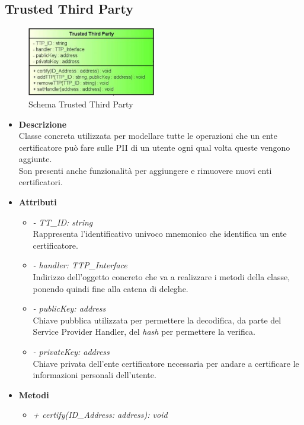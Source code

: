 \subsection{Trusted Third Party}
\begin{figure}[!h]
	\centering
	\includegraphics[width=0.5\textwidth]{immagini/ttpData}
	\caption{Schema Trusted Third Party}
\end{figure}
\begin{itemize}
	\item \textbf{Descrizione}\\
	Classe concreta utilizzata per modellare tutte le operazioni che un ente certificatore può fare sulle \gls{PII} di un utente ogni qual volta queste vengono aggiunte.\\
	Son presenti anche funzionalità per aggiungere e rimuovere nuovi enti certificatori.
	\item \textbf{Attributi}
	\begin{itemize}
		\item \textit{- TT\_ID: string}\\
		Rappresenta l'identificativo univoco mnemonico che identifica un ente certificatore.
		\item \textit{- handler: TTP\_Interface}\\
		Indirizzo dell'oggetto concreto che va a realizzare i metodi della classe, ponendo quindi fine alla catena di deleghe.
		\item \textit{- publicKey: address}\\
		Chiave pubblica utilizzata per permettere la decodifica, da parte del Service Provider Handler, del \textit{hash} per permettere la verifica.
		\item \textit{- privateKey: address}\\
		Chiave privata dell'ente certificatore necessaria per andare a certificare le informazioni personali dell'utente.
	\end{itemize}
	\item \textbf{Metodi}
	\begin{itemize}
		\item \textit{+ certify(ID\_Address: address): void}\\

\end{itemize}
\end{itemize}

